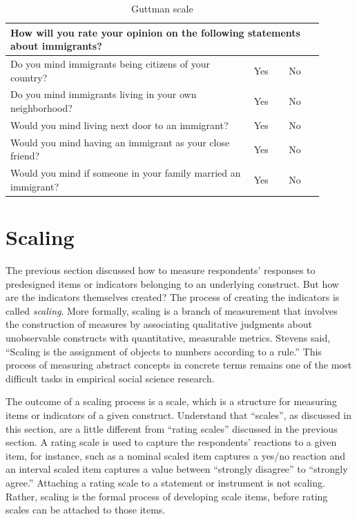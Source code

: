 \begin{description}
	\begin{table}[H]
	\centering
	\begin{tabularx}{0.95\linewidth}{p{0.70\linewidth}p{0.10\linewidth}p{0.10\linewidth}}
		\toprule
		\multicolumn{3}{p{0.95\linewidth}}{How will you rate your opinion on the following statements about immigrants?} \\	
		\midrule
		Do you mind immigrants being citizens of your country? & Yes & No \\
		Do you mind immigrants living in your own neighborhood? & Yes & No \\
		Would you mind living next door to an immigrant? & Yes & No \\
		Would you mind having an immigrant as your close friend? & Yes & No \\
		Would you mind if someone in your family married an immigrant? & Yes & No \\		
		\bottomrule
	\end{tabularx}
	\caption{Guttman scale}
	\label{tab06.05}
	\end{table}
	
\end{description}

\section{Scaling}

The previous section discussed how to measure respondents' responses to predesigned items or indicators belonging to an underlying construct. But how are the indicators themselves created? The process of creating the indicators is called \textit{scaling}. More formally, scaling is a branch of measurement that involves the construction of measures by associating qualitative judgments about unobservable constructs with quantitative, measurable metrics. Stevens\cite{stevens1946theory} said, ``Scaling is the assignment of objects to numbers according to a rule.'' This process of measuring abstract concepts in concrete terms remains one of the most difficult tasks in empirical social science research.

The outcome of a scaling process is a scale, which is a structure for measuring items or indicators of a given construct. Understand that ``scales'', as discussed in this section, are a little different from ``rating scales'' discussed in the previous section. A rating scale is used to capture the respondents' reactions to a given item, for instance, such as a nominal scaled item captures a yes/no reaction and an interval scaled item captures a value between ``strongly disagree'' to ``strongly agree.'' Attaching a rating scale to a statement or instrument is not scaling. Rather, scaling is the formal process of developing scale items, before rating scales can be attached to those items.

